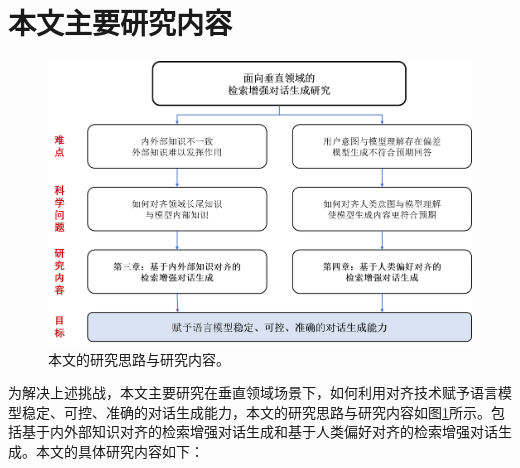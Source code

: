 \section{本文主要研究内容}

\begin{figure}[htbp]
	\centering
	\includegraphics[scale=0.55]{Fig/paper_structure.png}
	\caption{\label{research_idea_and_research_content_of_this_paper}本文的研究思路与研究内容。}
\end{figure}

为解决上述挑战，本文主要研究在垂直领域场景下，如何利用对齐技术赋予语言模型稳定、可控、准确的对话生成能力，本文的研究思路与研究内容如图\ref{research_idea_and_research_content_of_this_paper}所示。包括基于内外部知识对齐的检索增强对话生成和基于人类偏好对齐的检索增强对话生成。本文的具体研究内容如下：

